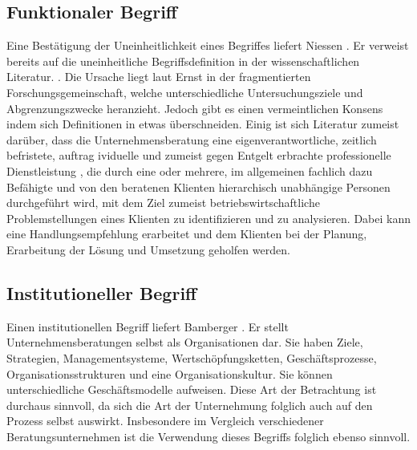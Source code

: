 \subsection*{Funktionaler Begriff}

Eine Bestätigung der Uneinheitlichkeit eines Begriffes liefert Niessen \cite[10]{nissen2007consulting}. Er verweist bereits auf die uneinheitliche Begriffsdefinition in der wissenschaftlichen Literatur. \cite[7]{ernst2002evaluation}. Die Ursache liegt laut Ernst \cite[10]{ernst2002evaluation} in der fragmentierten Forschungsgemeinschaft, welche unterschiedliche Untersuchungsziele und Abgrenzungszwecke heranzieht. 
Jedoch gibt es einen vermeintlichen Konsens indem sich Definitionen in etwas überschneiden. Einig ist sich Literatur  zumeist darüber, dass die Unternehmensberatung eine eigenverantwortliche, zeitlich befristete, auftrag
ividuelle und zumeist gegen Entgelt erbrachte professionelle Dienstleistung \cite[14]{Lippold201309}, die durch eine oder mehrere, im allgemeinen fachlich dazu Befähigte und von den beratenen Klienten hierarchisch unabhängige Personen durchgeführt wird, mit dem Ziel zumeist betriebswirtschaftliche Problemstellungen eines Klienten zu identifizieren und zu analysieren. Dabei kann eine Handlungsempfehlung erarbeitet und dem Klienten bei der Planung, Erarbeitung der Lösung und Umsetzung geholfen werden.  \cite[15]{nissen2007consulting}

\subsection*{Institutioneller Begriff}

Einen institutionellen Begriff liefert Bamberger \cite[16]{bamberg2008strategische}.
Er stellt Unternehmensberatungen selbst als Organisationen dar. Sie haben Ziele, Strategien, Managementsysteme, Wertschöpfungsketten, Geschäftsprozesse, Organisationsstrukturen und eine Organisationskultur. Sie können unterschiedliche Geschäftsmodelle aufweisen. Diese Art der Betrachtung ist durchaus sinnvoll, da sich die Art der Unternehmung folglich auch auf den Prozess selbst auswirkt. Insbesondere im Vergleich verschiedener Beratungsunternehmen ist die Verwendung dieses Begriffs folglich ebenso sinnvoll.

